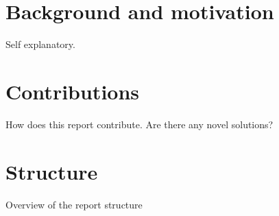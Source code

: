 \section*{Background and motivation}
Self explanatory. 
\section*{Contributions}
How does this report contribute. Are there any novel solutions?
\section*{Structure}
Overview of the report structure